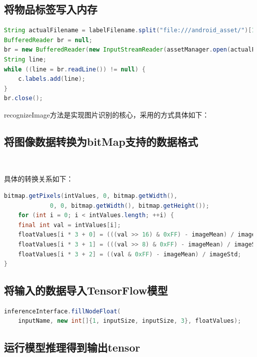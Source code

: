 \documentclass[UTF8, Microsoft YaHei]{book}
\begin{document}
	\subsection{将物品标签写入内存}

\begin{small}
\begin{lstlisting}[language=java]
String actualFilename = labelFilename.split("file:///android_asset/")[1];
BufferedReader br = null;
br = new BufferedReader(new InputStreamReader(assetManager.open(actualFilename)));
String line;
while ((line = br.readLine()) != null) {
    c.labels.add(line);
}
br.close();
\end{lstlisting}
\end{small}

		recognizeImage方法是实现图片识别的核心，采用的方式具体如下：

	\subsection{将图像数据转换为bitMap支持的数据格式}

	~

	具体的转换关系如下：

\begin{small}
\begin{lstlisting}[language=java]
bitmap.getPixels(intValues, 0, bitmap.getWidth(),
			 0, 0, bitmap.getWidth(), bitmap.getHeight());
    for (int i = 0; i < intValues.length; ++i) {
    final int val = intValues[i];
    floatValues[i * 3 + 0] = (((val >> 16) & 0xFF) - imageMean) / imageStd;
    floatValues[i * 3 + 1] = (((val >> 8) & 0xFF) - imageMean) / imageStd;
    floatValues[i * 3 + 2] = ((val & 0xFF) - imageMean) / imageStd;
}
\end{lstlisting}
\end{small}

	\subsection{将输入的数据导入TensorFlow模型}

\begin{small}
\begin{lstlisting}[language=java]
inferenceInterface.fillNodeFloat(                
    inputName, new int[]{1, inputSize, inputSize, 3}, floatValues);
\end{lstlisting}
\end{small}

	\subsection{运行模型推理得到输出tensor}
\end{document}
